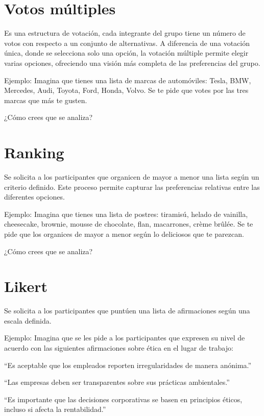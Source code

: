 \documentclass[
  letterpaper,
  DIV=11,
  numbers=noendperiod]{scrreprt}
\begin{document}
\section{Votos múltiples}\label{votos-muxfaltiples}

Es una estructura de votación, cada integrante del grupo tiene un número
de votos con respecto a un conjunto de alternativas. A diferencia de una
votación única, donde se selecciona solo una opción, la votación
múltiple permite elegir varias opciones, ofreciendo una visión más
completa de las preferencias del grupo.

Ejemplo: Imagina que tienes una lista de marcas de automóviles: Tesla,
BMW, Mercedes, Audi, Toyota, Ford, Honda, Volvo. Se te pide que votes
por las tres marcas que más te gusten.

¿Cómo crees que se analiza?

\section{Ranking}\label{ranking}

Se solicita a los participantes que organicen de mayor a menor una lista
según un criterio definido. Este proceso permite capturar las
preferencias relativas entre las diferentes opciones.

Ejemplo: Imagina que tienes una lista de postres: tiramisú, helado de
vainilla, cheesecake, brownie, mousse de chocolate, flan, macarrones,
crème brûlée. Se te pide que los organices de mayor a menor según lo
deliciosos que te parezcan.

¿Cómo crees que se analiza?

\section{Likert}\label{likert}

Se solicita a los participantes que puntúen una lista de afirmaciones
según una escala definida.

Ejemplo: Imagina que se les pide a los participantes que expresen su
nivel de acuerdo con las siguientes afirmaciones sobre ética en el lugar
de trabajo:

``Es aceptable que los empleados reporten irregularidades de manera
anónima.''

``Las empresas deben ser transparentes sobre sus prácticas
ambientales.''

``Es importante que las decisiones corporativas se basen en principios
éticos, incluso si afecta la rentabilidad.''
\end{document}
